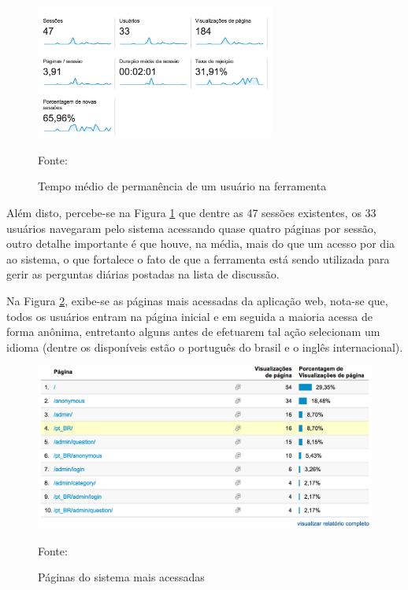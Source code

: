 \begin{figure}[h!tb]
	\caption{Tempo médio de permanência de um usuário na ferramenta}
	\label{fig:googleAnalyticsTempoAcesso}

	\centering
	\includegraphics[width=0.7\textwidth]{images/resultados/google-analytics-dados.png}

	\centering
	\footnotesize Fonte: \fonteOAutor
\end{figure}

\FloatBarrier 	%

Além disto, percebe-se na Figura \ref{fig:googleAnalyticsTempoAcesso} que dentre
as 47 sessões existentes, os 33 usuários navegaram pelo sistema acessando quase
quatro páginas por sessão, outro detalhe importante é que houve, na média, mais
do que um acesso por dia ao sistema, o que fortalece o fato de que a ferramenta
está sendo utilizada para gerir as perguntas diárias postadas na lista de
discussão.

Na Figura \ref{fig:googleAnalyticsPaginas}, exibe-se as páginas mais acessadas
da aplicação web, nota-se que, todos os usuários entram na página inicial e em
seguida a maioria acessa de forma anônima, entretanto alguns antes de efetuarem
tal ação selecionam um idioma (dentre os disponíveis estão o português do
brasil e o inglês internacional).

\begin{figure}[h!tb]
	\caption{Páginas do sistema mais acessadas}
	\label{fig:googleAnalyticsPaginas}

	\centering
	\includegraphics[width=\textwidth]{images/resultados/google-analytics-paginas.png}

	\centering
	\footnotesize Fonte: \fonteOAutor
\end{figure}

